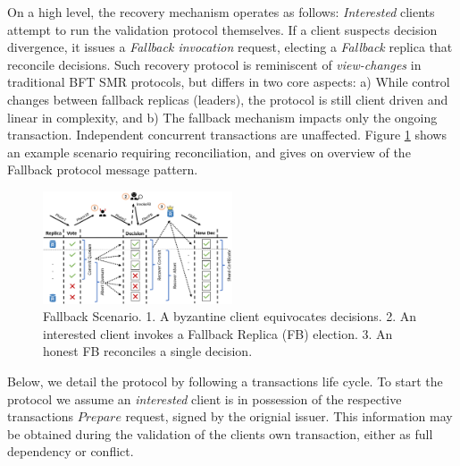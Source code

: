 On a high level, the recovery mechanism operates as follows: \textit{Interested} clients attempt to run the validation protocol themselves. If a client suspects decision divergence, it issues a \textit{Fallback invocation} request, electing a \textit{Fallback} replica that reconcile decisions. Such recovery protocol is reminiscent of \textit{view-changes} in traditional BFT SMR protocols, but differs in two core aspects: a) While control changes between fallback replicas (leaders), the protocol is still client driven and linear in complexity, and b) The fallback mechanism impacts only the ongoing transaction. Independent concurrent transactions are unaffected. Figure \ref{fig:FigureFBnom} shows an example scenario requiring reconciliation, and gives on overview of the  Fallback protocol message pattern.

\begin{figure}
\begin{center}
\includegraphics[width= 0.5\textwidth]{./figures/FBNom.png}
\end{center}
\caption{Fallback Scenario. 1. A byzantine client equivocates decisions. 2. An interested client invokes a Fallback Replica (FB) election. 3. An honest FB reconciles a single decision.}
\label{fig:FigureFBnom}
\end{figure}


Below, we detail the protocol by following a transactions life cycle. To start the protocol we assume an \textit{interested} client is in possession of the respective transactions $Prepare$ request, signed by the orignial issuer. This information may be obtained during the validation of the clients own transaction, either as full dependency or conflict. 



